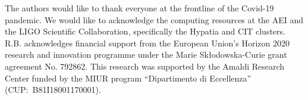 The authors would like to thank everyone at the frontline of the Covid-19 pandemic. We would like to acknowledge the computing resources at the AEI and the LIGO Scientific Collaboration, specifically the Hypatia and CIT clusters. R.B. acknowledges financial support from the European Union's Horizon 2020 research and innovation programme under the Marie Sk\l odowska-Curie grant agreement No. 792862. This research was supported by the Amaldi Research Center funded by the MIUR program ``Dipartimento di Eccellenza'' (CUP:~B81I18001170001).
